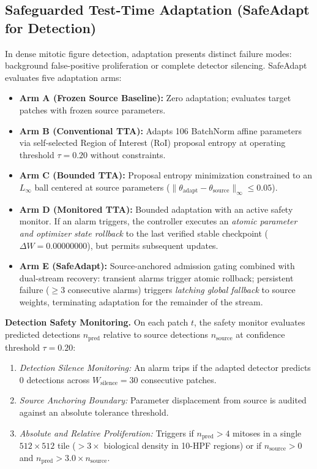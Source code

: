 \documentclass[conference]{IEEEtran}
\begin{document}
\subsection{Safeguarded Test-Time Adaptation (SafeAdapt for Detection)}
In dense mitotic figure detection, adaptation presents distinct failure modes: background false-positive proliferation or complete detector silencing.
SafeAdapt evaluates five adaptation arms:
\begin{itemize}
\item \textbf{Arm A (Frozen Source Baseline):} Zero adaptation; evaluates target patches with frozen source parameters.
\item \textbf{Arm B (Conventional TTA):} Adapts 106 BatchNorm affine parameters via self-selected Region of Interest (RoI) proposal entropy at operating threshold $\tau = 0.20$ without constraints.
\item \textbf{Arm C (Bounded TTA):} Proposal entropy minimization constrained to an $L_\infty$ ball centered at source parameters ($\|\theta_{\mathrm{adapt}} - \theta_{\mathrm{source}}\|_\infty \le 0.05$).
\item \textbf{Arm D (Monitored TTA):} Bounded adaptation with an active safety monitor. If an alarm triggers, the controller executes an \emph{atomic parameter and optimizer state rollback} to the last verified stable checkpoint ($\Delta W = 0.00000000$), but permits subsequent updates.
\item \textbf{Arm E (SafeAdapt):} Source-anchored admission gating combined with dual-stream recovery: transient alarms trigger atomic rollback; persistent failure ($\ge 3$ consecutive alarms) triggers \emph{latching global fallback} to source weights, terminating adaptation for the remainder of the stream.
\end{itemize}

\textbf{Detection Safety Monitoring.}
On each patch $t$, the safety monitor evaluates predicted detections $n_{\mathrm{pred}}$ relative to source detections $n_{\mathrm{source}}$ at confidence threshold $\tau=0.20$:
\begin{enumerate}
\item \emph{Detection Silence Monitoring:} An alarm trips if the adapted detector predicts 0 detections across $W_{\mathrm{silence}} = 30$ consecutive patches.
\item \emph{Source Anchoring Boundary:} Parameter displacement from source is audited against an absolute tolerance threshold.
\item \emph{Absolute and Relative Proliferation:} Triggers if $n_{\mathrm{pred}} > 4$ mitoses in a single $512 \times 512$ tile ($>3\times$ biological density in 10-HPF regions) or if $n_{\mathrm{source}} > 0$ and $n_{\mathrm{pred}} > 3.0 \times n_{\mathrm{source}}$.
\end{enumerate}
\end{document}
